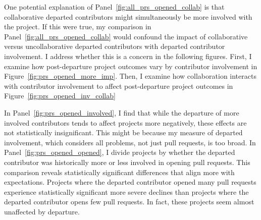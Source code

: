 \documentclass[12pt,notitlepage]{article}
\begin{document}
One potential explanation of Panel~\ref{fig:all_prs_opened_collab} is that collaborative departed contributors might simultaneously be more involved with the project. If this were true, my comparison in Panel~\ref{fig:all_prs_opened_collab} would confound the impact of collaborative versus uncollaborative departed contributors with departed contributor involvement. I address whether this is a concern in the following figures. First, I examine how post-departure project outcomes vary by contributor involvement in Figure~\ref{fig:prs_opened_more_imp}. Then, I examine how collaboration interacts with contributor involvement to affect post-departure project outcomes in Figure~\ref{fig:prs_opened_inv_collab}


In Panel~\ref{fig:prs_opened_involved}, I find that while the departure of more involved contributors tends to affect projects more negatively, these effects are not statistically insignificant. This might be because my measure of departed involvement, which considers all problems, not just pull requests, is too broad. In Panel~\ref{fig:prs_opened_opened}, I divide projects by whether the departed contributor was historically more or less involved in opening pull requests. This comparison reveals statistically significant differences that align more with expectations. Projects where the departed contributor opened many pull requests experience statistically significant more severe declines than projects where the departed contributor opens few pull requests. In fact, these projects seem almost unaffected by departure. 
\end{document}
